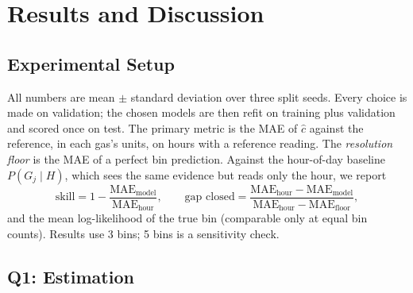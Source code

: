 \section{Results and Discussion}
\label{sec:results}

\subsection{Experimental Setup}
\label{sec:setup}
All numbers are mean $\pm$ standard deviation over three split seeds. Every
choice is made on validation; the chosen models are then refit on training plus
validation and scored once on test. The primary metric is the MAE of $\hat c$
against the reference, in each gas's units, on hours with a reference reading.
The \emph{resolution floor} is the MAE of a perfect bin prediction. Against the
hour-of-day baseline $P(G_j \mid H)$, which sees the same evidence but reads
only the hour, we report
\begin{equation}
  \text{skill} = 1 - \frac{\text{MAE}_\text{model}}{\text{MAE}_\text{hour}},
  \qquad
  \text{gap closed} =
  \frac{\text{MAE}_\text{hour} - \text{MAE}_\text{model}}
       {\text{MAE}_\text{hour} - \text{MAE}_\text{floor}},
  \label{eq:skill}
\end{equation}
and the mean log-likelihood of the true bin (comparable only at equal bin
counts). Results use 3 bins; 5 bins is a sensitivity check.

\subsection{Q1: Estimation}
\label{sec:q1}

